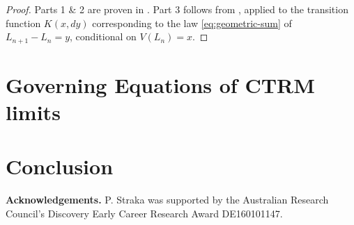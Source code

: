 \documentclass[12pt, a4paper]{article}
\newcommand{\1}{\mathbf 1}
\begin{document}
\begin{proof}
Parts 1 \& 2 are proven in 
\cite[Proposition 4.1 (i) \& (iii)]{resnick2013extreme}.
Part 3 follows from \cite[Proposition 3.8]{resnick2013extreme}, 
applied to the transition function $K(x,dy)$ corresponding to the law \eqref{eq:geometric-sum} of $L_{n+1} - L_n = y$, conditional on $V(L_n) = x$. 
\end{proof}




\section{Governing Equations of CTRM limits}




\section{Conclusion}


{\bf Acknowledgements.} P. Straka was supported by the Australian Research Council’s Discovery Early Career Research Award DE160101147.




\end{document}
